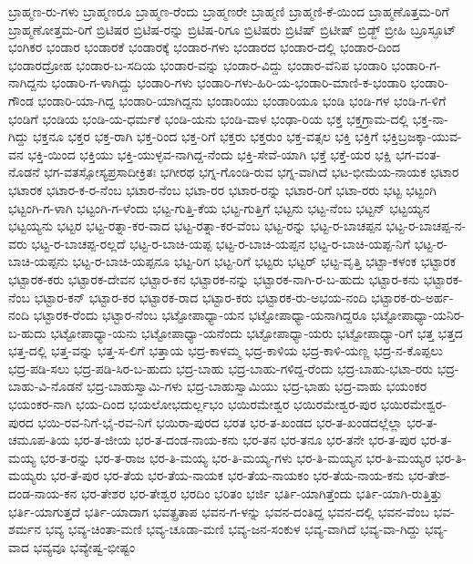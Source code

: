 ಬ್ರಾಹ್ಮಣ-ರು-ಗಳು
ಬ್ರಾಹ್ಮಣರೂ
ಬ್ರಾಹ್ಮಣ-ರೆಂದು
ಬ್ರಾಹ್ಮಣರೇ
ಬ್ರಾಹ್ಮಣಿ
ಬ್ರಾಹ್ಮಣಿ-ಕೆ-ಯಿಂದ
ಬ್ರಾಹ್ಮಣೊತ್ತಮ-ರಿಗೆ
ಬ್ರಾಹ್ಮಣೋತ್ತಮ-ರಿಗೆ
ಬ್ರಿಟಿಷರ
ಬ್ರಿಟಿಷ-ರನ್ನು
ಬ್ರಿಟಿಷ-ರಿಗೂ
ಬ್ರಿಟಿಷರು
ಬ್ರಿಟಿಷ್
ಬ್ರಿಟೀಷ್
ಬ್ರಿಡ್ಜ್
ಬ್ರೀಹಿ
ಬ್ರೂಸ್ಫೂಟ್
ಭಂಗಿಕರ
ಭಂಡಾರ
ಭಂಡಾರಕೆ
ಭಂಡಾರಕ್ಕೆ
ಭಂಡಾರ-ಗಳು
ಭಂಡಾರದ
ಭಂಡಾರ-ದಲ್ಲಿ
ಭಂಡಾರ-ದಿಂದ
ಭಂಡಾರದ್ರೋಹ
ಭಂಡಾರ-ಬ-ಸದಿಯ
ಭಂಡಾರ-ವನ್ನು
ಭಂಡಾರ-ವಿದ್ದು
ಭಂಡಾರ-ವೆನಿಪ
ಭಂಡಾರಿ
ಭಂಡಾರಿ-ಗ-ನಾಗಿದ್ದನು
ಭಂಡಾರಿ-ಗ-ಳಾಗಿದ್ದು
ಭಂಡಾರಿ-ಗಳು
ಭಂಡಾರಿ-ಗಳು-ಹಿರಿ-ಯ-ಭಂಡಾರಿ-ಮಾಣಿ-ಕ-ಭಂಡಾರಿ
ಭಂಡಾರಿ-ಗೌಂಡ
ಭಂಡಾರಿ-ಯಾ-ಗಿದ್ದ
ಭಂಡಾರಿ-ಯಾಗಿದ್ದನು
ಭಂಡಾರಿಯು
ಭಂಡಾರಿಯೂ
ಭಂಡಿ
ಭಂಡಿ-ಗಳ
ಭಂಡಿ-ಗ-ಳಿಗೆ
ಭಂಡಿಗೆ
ಭಂಡಿಯ
ಭಂಡಿ-ಯ-ಧರ್ಮಕೆ
ಭಂಡಿ-ಯನು
ಭಂಡಿ-ವಾಳ
ಭಂಢಾ-ರಿಯ
ಭಕ್ತ
ಭಕ್ತಗ್ರಾಮ-ದಲ್ಲಿ
ಭಕ್ತ-ನಾ-ಗಿದ್ದು
ಭಕ್ತನೂ
ಭಕ್ತರ
ಭಕ್ತ-ರಾಗಿ
ಭಕ್ತ-ರಿಂದ
ಭಕ್ತ-ರಿಗೆ
ಭಕ್ತರು
ಭಕ್ತರುಂ
ಭಕ್ತ-ವತ್ಸಲ
ಭಕ್ತಿ
ಭಕ್ತಿಗೆ
ಭಕ್ತಿಬ್ರಜಕ್ಕಾ-ಯುವ-ವನ
ಭಕ್ತಿ-ಯಿಂದ
ಭಕ್ತಿಯು
ಭಕ್ತಿ-ಯುಳ್ಳವ-ನಾಗಿದ್ದ-ನೆಂದು
ಭಕ್ತಿ-ಸೇವೆ-ಯಾಗಿ
ಭಕ್ತೆ
ಭಕ್ತೆ-ಯರ
ಭಕ್ಷಿ
ಭಗ-ವಂತ-ನೊಡನೆ
ಭಗ-ವತಸ್ಸೋಸ್ಯಪ್ರಸಾದೀಕ್ರಿತಃ
ಭಗೀರಥ
ಭಗ್ನ-ಗೊಂಡಿ-ರುವ
ಭಗ್ನ-ವಾಗಿದೆ
ಭಟ-ಭೀಮೆಯ-ನಾಯಕ
ಭಟಾರ
ಭಟಾರಕ
ಭಟಾರ-ಕ-ರ-ನೆಂಬ
ಭಟಾರ-ನೆಂಬ
ಭಟಾ-ರರ
ಭಟಾರ-ರನ್ನು
ಭಟಾರ-ರಿಗೆ
ಭಟಾ-ರರು
ಭಟ್ಟ
ಭಟ್ಟಂಗಿ
ಭಟ್ಟಂಗಿ-ಗ-ಳಾಗಿ
ಭಟ್ಟಂಗಿ-ಗ-ಳೆಂದು
ಭಟ್ಟ-ಗುತ್ತಿ-ಕೆಯ
ಭಟ್ಟ-ಗುತ್ತಿಗೆ
ಭಟ್ಟನು
ಭಟ್ಟ-ನೆಂಬ
ಭಟ್ಟನ್
ಭಟ್ಟಯ್ಯನ
ಭಟ್ಟಯ್ಯನು
ಭಟ್ಟರ
ಭಟ್ಟ-ರತ್ನಾ-ಕರ-ವಾದ
ಭಟ್ಟ-ರತ್ನಾ-ಕರ-ವೆಂಬ
ಭಟ್ಟ-ರನ್ನು
ಭಟ್ಟ-ರ-ಬಾಚಪ್ಪನ
ಭಟ್ಟ-ರ-ಬಾಚಪ್ಪ-ನ-ವರು
ಭಟ್ಟ-ರ-ಬಾಚಪ್ಪ-ರಲ್ಲದೆ
ಭಟ್ಟ-ರ-ಬಾಚಿ-ಯಪ್ಪ
ಭಟ್ಟ-ರ-ಬಾಚಿ-ಯಪ್ಪನ
ಭಟ್ಟ-ರ-ಬಾಚಿ-ಯಪ್ಪ-ನಿಗೆ
ಭಟ್ಟ-ರ-ಬಾಚಿ-ಯಪ್ಪನು
ಭಟ್ಟ-ರ-ಬಾಚಿ-ಯಪ್ಪನೂ
ಭಟ್ಟ-ರಿಗ
ಭಟ್ಟ-ರಿಗೆ
ಭಟ್ಟರು
ಭಟ್ಟರ್
ಭಟ್ಟ-ವೃತ್ತಿ
ಭಟ್ಟಾ-ಕಳಂಕ
ಭಟ್ಟಾರಕ
ಭಟ್ಟಾರಕ-ಕರು
ಭಟ್ಟಾರಕ-ದೇವನ
ಭಟ್ಟಾರ-ಕನ
ಭಟ್ಟಾರಕ-ನನ್ನು
ಭಟ್ಟಾರಕ-ನಾಗಿ-ರ-ಬ-ಹುದು
ಭಟ್ಟಾರ-ಕನು
ಭಟ್ಟಾರಕ-ನೆಂಬ
ಭಟ್ಟಾರ-ಕನ್
ಭಟ್ಟಾರ-ಕರ
ಭಟ್ಟಾರಕ-ರಾದ
ಭಟ್ಟಾರ-ಕರು
ಭಟ್ಟಾರಕ-ರು-ಅಭಯ-ನಂದಿ
ಭಟ್ಟಾರಕ-ರು-ಅರ್ಹ-ನಂದಿ
ಭಟ್ಟಾರಕ-ರೆಂದು
ಭಟ್ಟಾರ-ನೆಂಬ
ಭಟ್ಟೋಪಾಧ್ಯಾ-ಯನ
ಭಟ್ಟೋಪಾಧ್ಯಾ-ಯನಾಗಿದ್ದರೂ
ಭಟ್ಟೋಪಾಧ್ಯಾ-ಯನಿರ-ಬ-ಹುದು
ಭಟ್ಟೋಪಾಧ್ಯಾ-ಯನು
ಭಟ್ಟೋಪಾಧ್ಯಾ-ಯನೆಂದು
ಭಟ್ಟೋಪಾಧ್ಯಾ-ಯರು
ಭಟ್ಟೋಪಾಧ್ಯಾ-ರಿಗೆ
ಭತ್ತ
ಭತ್ತದ
ಭತ್ತ-ದಲ್ಲಿ
ಭತ್ತ-ವನ್ನು
ಭತ್ತ-ಸ-ಲಿಗೆ
ಭತ್ತಾಯ
ಭದ್ರ-ಕಾಳಮ್ಮ
ಭದ್ರ-ಕಾಳಿಯ
ಭದ್ರ-ಕಾಳಿ-ಯಣ್ಣ
ಭದ್ರ-ನ-ಕೊಪ್ಪಲು
ಭದ್ರ-ಪಡಿ-ಸಲು
ಭದ್ರ-ಪಡಿ-ಸಿರ-ಬ-ಹುದು
ಭದ್ರ-ಬಾಹು
ಭದ್ರ-ಬಾಹು-ಗಳಿದ್ದ-ರೆಂದು
ಭದ್ರ-ಬಾಹು-ಭಟಾ-ರರು
ಭದ್ರ-ಬಾಹು-ವಿ-ನೊಡನೆ
ಭದ್ರ-ಬಾಹುಸ್ವಾಮಿ-ಗಳು
ಭದ್ರ-ಬಾಹುಸ್ವಾಮಿಯು
ಭದ್ರ-ಭಾಹು
ಭದ್ರ-ವಾಹು
ಭಯಂಕರ
ಭಯಂಕರ-ನಾಗಿ
ಭಯ-ದಿಂದ
ಭಯಲೋಭದುರ್ಲ್ಲಭಂ
ಭಯಿರಮೇಶ್ವರ
ಭಯಿರಮೇಶ್ವರ-ಪುರ
ಭಯಿರಮೇಶ್ವರ-ಪುರದ
ಭಯಿ-ರವ-ನಿಗೆ-ಭೈ-ರವ-ನಿಗೆ
ಭಯಿರಾ-ಪುರದ
ಭರತ
ಭರ-ತ-ಖಂಡದ
ಭರ-ತ-ಖಂಡದಲ್ಲೆಲ್ಲಾ
ಭರ-ತ-ಚಮೂಪ-ತಿಯ
ಭರ-ತ-ಜೀಯ
ಭರ-ತ-ದಂಡ-ನಾಯ-ಕನು
ಭರ-ತನ
ಭರ-ತನೂ
ಭರ-ತನೇ
ಭರ-ತ-ಪುರ
ಭರ-ತ-ಮಯ್ಯ
ಭರ-ತ-ರನ್ನು
ಭರ-ತ-ರಾಜ
ಭರ-ತಿ-ಮಯ್ಯ
ಭರ-ತಿ-ಮಯ್ಯ-ಗಳು
ಭರ-ತಿ-ಮಯ್ಯನ
ಭರ-ತಿ-ಮಯ್ಯರ
ಭರ-ತಿ-ಮಯ್ಯರು
ಭರ-ತೆ-ಪುರ
ಭರ-ತೆಯ
ಭರ-ತೆಯ-ನಾಯಕ
ಭರ-ತೆಯ-ನಾಯಕಂ
ಭರ-ತೆಯ-ನಾಯ-ಕನು
ಭರ-ತೇಶ-ದಂಡ-ನಾಯ-ಕನ
ಭರ-ತೇಶರ
ಭರ-ತೇಶ್ವರ
ಭರದಿಂ
ಭರಿತಂ
ಭರ್ಜಿ
ಭರ್ತಿ-ಯಾಗಿತ್ತೆಂದು
ಭರ್ತಿ-ಯಾಗಿ-ರುತ್ತಿತ್ತು
ಭರ್ತಿ-ಯಾಗುತ್ತದೆ
ಭರ್ತಿ-ಯಾದಾಗ
ಭವತ್ಪ್ರತಾಪ
ಭವನ-ಗ-ಳನ್ನು
ಭವನ-ದಂತಿದ್ದ
ಭವನ-ದಲ್ಲಿ
ಭವನ-ವೆಂಬ
ಭವ-ಶರ್ಮನ
ಭವ್ಯ
ಭವ್ಯ-ಚಿಂತಾ-ಮಣಿ
ಭವ್ಯ-ಚೂಡಾ-ಮಣಿ
ಭವ್ಯ-ಜನ-ಸಂಕುಳ
ಭವ್ಯ-ವಾಗಿದೆ
ಭವ್ಯ-ವಾ-ಗಿದ್ದು
ಭವ್ಯ-ವಾದ
ಭವ್ಯವೂ
ಭವ್ಯೇಷ್ವ-ಭೀಷ್ಟಂ
